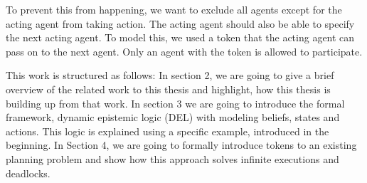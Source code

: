 To prevent this from happening, we want to exclude all agents except for the acting agent from taking action. The acting agent should also be able to specify the next acting agent. To model this, we used a token that the acting agent can pass on to the next agent. Only an agent with the token  is allowed to participate.






This work is structured as follows:
In section 2, we are going to give a brief overview of the related work to this thesis and highlight, how this thesis is building up from that work. In section 3 we are going to introduce the formal framework, dynamic epistemic logic (DEL) with modeling beliefs, states and actions. This logic is explained using a specific example, introduced in the beginning. In Section 4, we are going to formally introduce tokens to an existing planning problem and show how this approach solves infinite executions and deadlocks.
